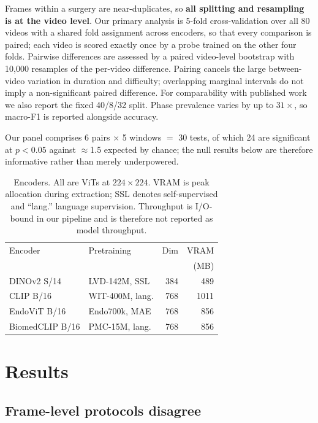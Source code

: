 \documentclass[10pt,twocolumn]{article}
\begin{document}
Frames within a surgery are near-duplicates, so \textbf{all splitting and
resampling is at the video level}. Our primary analysis is 5-fold
cross-validation over all 80 videos with a shared fold assignment across
encoders, so that every comparison is paired; each video is scored exactly once
by a probe trained on the other four folds. Pairwise differences are assessed
by a paired video-level bootstrap \citep{efron1994bootstrap} with 10{,}000
resamples of the per-video difference. Pairing cancels the large between-video
variation in duration and difficulty; overlapping marginal intervals do not
imply a non-significant paired difference. For comparability with published
work we also report the fixed 40/8/32 split. Phase prevalence varies by up to
$31\times$, so macro-F1 is reported alongside accuracy.

Our panel comprises 6 pairs $\times$ 5 windows $=$ 30 tests, of which 24 are
significant at $p<0.05$ against $\approx$1.5 expected by chance; the null
results below are therefore informative rather than merely underpowered.

\begin{table}[t]\centering\footnotesize
\setlength{\tabcolsep}{3pt}
\caption{Encoders. All are ViTs at $224\times224$. VRAM is peak allocation
during extraction; SSL denotes self-supervised and ``lang.'' language
supervision. Throughput is I/O-bound in our pipeline and is therefore not
reported as model throughput.}
\label{tab:encoders}
\begin{tabular}{@{}llrr@{}}
\toprule
Encoder & Pretraining & Dim & VRAM \\
 & & & (MB) \\
\midrule
DINOv2 S/14     & LVD-142M, SSL   & 384 & 489 \\
CLIP B/16       & WIT-400M, lang. & 768 & 1011 \\
EndoViT B/16    & Endo700k, MAE   & 768 & 856 \\
BiomedCLIP B/16 & PMC-15M, lang.  & 768 & 856 \\
\bottomrule
\end{tabular}
\end{table}

\section{Results}

\subsection{Frame-level protocols disagree}
\label{sec:frame}
\end{document}
